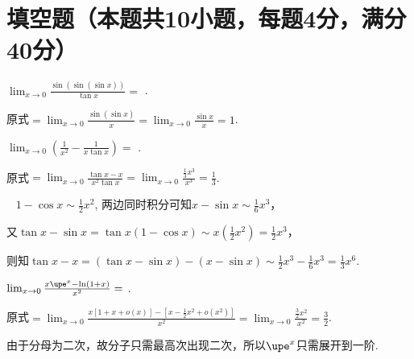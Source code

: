 \documentclass{CWNUExam}
\begin{document}
\maketitle

\section{填空题（本题共10小题，每题4分，满分40分）}

\begin{problem}
  $\lim _{x \to 0} \frac{\sin (\sin (\sin x))}{\tan x}=$
  \fillin[1].
\end{problem}

\begin{analysis}
  原式$=\lim_{x \to 0} \frac{\sin\left( \sin x \right)}{x} = \lim_{x \to 0} \frac{\sin x}{x} = 1$.
\end{analysis}

\begin{problem}
  $\lim _{x \to 0}\left(\frac{1}{x^{2}}-\frac{1}{x \tan x}\right)=$
  \fillin[$\frac{1}{3}$].
\end{problem}

\begin{analysis}
  原式$=\lim_{x \to 0} \frac{\tan x - x}{x^2 \tan x} = \lim_{x \to 0} \frac{\frac{1}{3}x^3}{x^3} = \frac{1}{3}$.

  \faMortarBoard~ $1 - \cos x \sim \frac{1}{2}x^2$, 两边同时积分可知$x - \sin x \sim \frac{1}{6}x^3$，

  又$\tan x - \sin x = \tan x \left( 1 - \cos x \right) \sim x \left( \frac{1}{2}x^2 \right) = \frac{1}{2}x^3$，

  则知$\tan x - x = \left( \tan x - \sin x \right) - \left( x - \sin x \right) \sim \frac{1}{2}x^3 - \frac{1}{6} x^3 = \frac{1}{3}x^6$.
\end{analysis}

\begin{problem}
  $\lim _{x \to 0} \frac{x \upe^{x}-\ln (1+x)}{x^{2}}=$
  \fillin[$\frac{3}{2}$].
\end{problem}

\begin{analysis}
  原式$=\lim_{x \to 0} \frac{x \left[ 1+x+o(x) \right] - \left[ x - \frac{1}{2}x^2 +o(x^2) \right]}{x^2} = \lim_{x \to 0} \frac{\frac{3}{2}x^2}{x^2} = \frac{3}{2}$.

  \faMortarBoard 由于分母为二次，故分子只需最高次出现二次，所以$\upe^x$只需展开到一阶.
\end{analysis}
\end{document}
